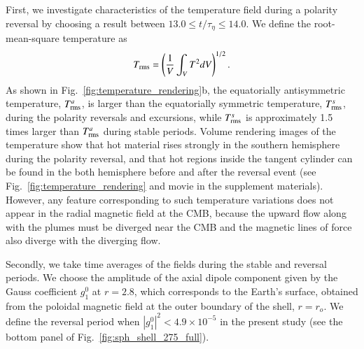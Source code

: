 First, we investigate characteristics of the temperature field during a polarity reversal by choosing a result between $13.0 \le t/\tau_{\eta} \le 14.0$. 
{\color{teal}
We define the root-mean-square temperature as
%
\begin{equation}
T_{\rm rms} = \left( \frac{1}{V}
  \int_V T^2 d V \right)^{1/2} .
\label{eq:Trms}
\end{equation}
%
}
{\color{teal}
As shown in Fig.~\ref{fig:temperature_rendering}b, the equatorially antisymmetric temperature, $T_{\rm rms}^a$, is larger than the equatorially symmetric temperature, $T_{\rm rms}^s$, during the polarity reversals and excursions, while $T_{\rm rms}^s$ is approximately 1.5 times larger than $T_{\rm rms}^a$ during stable periods.
}
Volume rendering images of the temperature show that hot material rises strongly in the southern hemisphere during the polarity reversal, and that hot regions inside the tangent cylinder can be found in the both hemisphere before and after the reversal event
(see Fig.~\ref{fig:temperature_rendering} and movie in the supplement materials). 
{\color{teal}
However, any feature corresponding to such temperature variations does not appear in the radial magnetic field at the CMB, 
}
because the upward flow along with the plumes must be diverged near the CMB and the magnetic lines of force also diverge with the diverging flow.

{\color{magenta}
Secondly, we take time averages of the fields during the stable and reversal periods. 
We choose the amplitude of the axial dipole component given by the Gauss coefficient $g_{1}^{0}$ at $r = 2.8$, which corresponds to the Earth's surface, obtained from the poloidal magnetic field at the outer boundary of the shell, $r = r_{o}$.
} 
We define the reversal period when $\left| g_{1}^{0} \right|^2 < 4.9 \times 10^{-5}$ in the present study (see the bottom panel of Fig.~\ref{fig:sph_shell_275_full}). 

